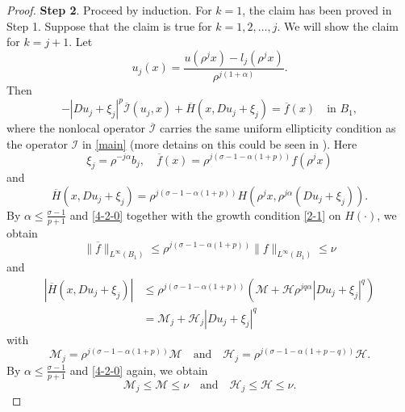 \documentclass[11pt,reqno]{amsart}
\numberwithin{equation}{section}
\begin{document}
\begin{proof}
\textbf{Step 2}. Proceed by induction. For $k=1$, the claim has been proved in Step 1. Suppose that the claim is true for $k=1,2,\dots,j$.
We will show the claim for $k=j+1$. Let
$$
u_j(x)=\frac{u(\rho^j x)-l_j(\rho^j x)}{\rho^{j(1+\alpha)}}.
$$
Then
\begin{equation}
\label{4-2-2}
-|Du_j+\xi_j|^p\overline{\mathcal{I}}(u_j,x)+\overline{H}(x,Du_j+\xi_j)=\overline{f}(x)  \quad\text{in }  B_1,
\end{equation}
where the nonlocal operator $\overline{\mathcal{I}}$ carries the same uniform ellipticity condition as the operator $\mathcal{I}$ in \eqref{main} (more detains on this could be seen in \cite{CS11}).
Here
$$
\xi_j=\rho^{-j\alpha}b_j, \quad \overline{f}(x)=\rho^{j(\sigma-1-\alpha(1+p))}f(\rho^jx)
$$
and
$$
\overline{H}(x,Du_j+\xi_j)=\rho^{j(\sigma-1-\alpha(1+p))}H(\rho^jx,\rho^{j\alpha}(Du_j+\xi_j)).
$$
By $\alpha\le\frac{\sigma-1}{p+1}$ and \eqref{4-2-0} together with the growth condition \eqref{2-1} on $H(\cdot)$, we obtain
$$
\|\overline{f}\|_{L^\infty(B_1)}\le \rho^{j(\sigma-1-\alpha(1+p))}\|f\|_{L^\infty(B_1)}\le\nu
$$
and
\begin{align*}
|\overline{H}(x,Du_j+\xi_j)|&\le\rho^{j(\sigma-1-\alpha(1+p))}\left(\mathcal{M}+\mathcal{H}\rho^{jq\alpha}|Du_j+\xi_j|^q\right)\\
&=\mathcal{M}_j+\mathcal{H}_j|Du_j+\xi_j|^q
\end{align*}
with
$$
\mathcal{M}_j=\rho^{j(\sigma-1-\alpha(1+p))}\mathcal{M} \quad\text{and}\quad \mathcal{H}_j=\rho^{j(\sigma-1-\alpha(1+p-q))}\mathcal{H}.
$$
By $\alpha\le\frac{\sigma-1}{p+1}$ and \eqref{4-2-0} again, we obtain
$$
\mathcal{M}_j\le \mathcal{M}\le \nu \quad\text{and}\quad  \mathcal{H}_j\le\mathcal{H}\le \nu.
$$


\end{proof}
\end{document}
